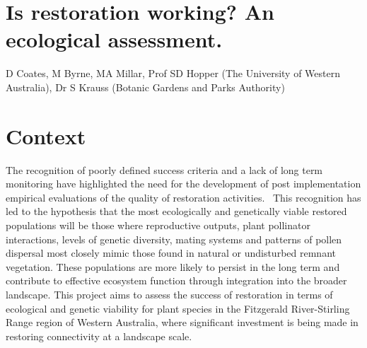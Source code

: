 \documentclass[version=last,
    paper=a4, %
    10pt, %
    usenames,
    dvipsnames,
    oneside, %
    headings=openany, %
    DIV=15 %
]{scrbook}
\begin{document}
\section*{Is restoration working? An ecological assessment.
}

D Coates, M Byrne, MA Millar, Prof SD Hopper (The University of Western
Australia), Dr S Krauss (Botanic Gardens and Parks Authority)


\section*{Context}
The recognition of poorly defined success criteria and a lack of long
term monitoring have highlighted the need for the development of post
implementation empirical evaluations of the quality of restoration
activities.~ This recognition has led to the hypothesis that the most
ecologically and genetically viable restored populations will be those
where reproductive outputs, plant pollinator interactions, levels of
genetic diversity, mating systems and patterns of pollen dispersal most
closely mimic those found in natural or undisturbed remnant vegetation.
These populations are more likely to persist in the long term and
contribute to effective ecosystem function through integration into the
broader landscape. This project aims to assess the success of
restoration in terms of ecological and genetic viability for plant
species in the Fitzgerald River-Stirling Range region of Western
Australia, where significant investment is being made in restoring
connectivity at a landscape scale.
\end{document}
